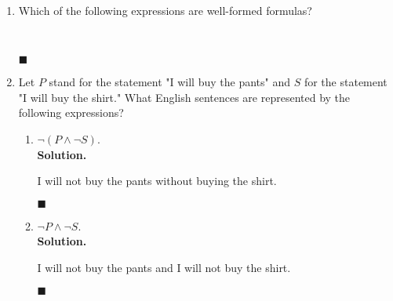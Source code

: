 \documentclass{report}
\newcommand{\sol}{\vspace{1em}\\\textbf{Solution.}\vspace{0.5em}}
\newcommand{\qed}{\ \\\strut\hfill$\blacksquare$\vspace{1em}}
\begin{document}
\begin{enumerate}[leftmargin=*]
      \item  Which of the following expressions are well-formed formulas?
            \begin{enumerate}
                  \setlength{\columnsep}{1cm}
            \end{enumerate}\vspace{-2em}‎\qed

      \item Let $P$ stand for the statement "I will buy the pants" and $S$ for the
            statement "I will buy the shirt." What English sentences are represented by the
            following expressions?
            \begin{enumerate}
                  \item $\neg(P \wedge \neg S)$.
                        \sol{}

                        I will not buy the pants without buying the shirt. \qed

                  \item $\neg P \wedge \neg S$.
                        \sol{}

                        I will not buy the pants and I will not buy the shirt. \qed


\end{enumerate}
\end{enumerate}
\end{document}
